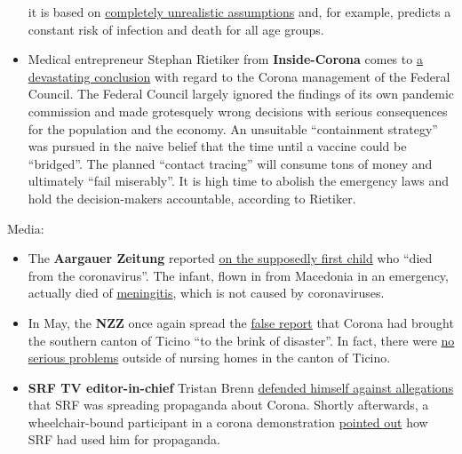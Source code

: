 \begin{itemize}
  it is based on
  \href{https://www.heise.de/tp/features/Fellay-Studie-Zweite-Corona-Welle-4726303.html}{completely
  unrealistic assumptions} and, for example, predicts a constant risk of
  infection and death for all age groups.
\item
  Medical entrepreneur Stephan Rietiker from \textbf{Inside-Corona}
  comes to
  \href{https://www.insidecorona.ch/2020/05/21/coronakrise-professionelles-krisenmanagement-sieht-anders-aus/}{a
  devastating conclusion} with regard to the Corona management of the
  Federal Council. The Federal Council largely ignored the findings of
  its own pandemic commission and made grotesquely wrong decisions with
  serious consequences for the population and the economy. An unsuitable
  ``containment strategy'' was pursued in the naive belief that the time
  until a vaccine could be ``bridged''. The planned ``contact tracing''
  will consume tons of money and ultimately ``fail miserably''. It is
  high time to abolish the emergency laws and hold the decision-makers
  accountable, according to Rietiker.
\end{itemize}

Media:

\begin{itemize}
\tightlist
\item
  The \textbf{Aargauer Zeitung} reported
  \href{https://www.aargauerzeitung.ch/aargau/kanton-aargau/erstes-kind-am-coronavirus-gestorben-aargauer-saeugling-zur-behandlung-heimgeflogen-137988950}{on
  the supposedly first child} who ``died from the coronavirus''. The
  infant, flown in from Macedonia in an emergency, actually died of
  \href{https://www.srf.ch/news/regional/aargau-solothurn/verwirrung-um-todesursache-trauriges-ereignis-aargauer-baby-stirbt-nach-corona-infektion}{meningitis},
  which is not caused by coronaviruses.
\item
  In May, the \textbf{NZZ} once again spread the
  \href{https://www.nzz.ch/gesellschaft/wie-corona-das-tessin-an-den-rand-einer-katastrophe-brachte-und-die-willensnation-auf-die-probe-stellte-ld.1556749}{false
  report} that Corona had brought the southern canton of Ticino ``to the
  brink of disaster''. In fact, there were
  \href{https://www.blick.ch/news/schweiz/tessin/tessiner-spitaldirektor-widerspricht-dem-bundesamt-fuer-gesundheit-wir-haben-genuegend-intensivbetten-id15808076.html}{no
  serious problems} outside of nursing homes in the canton of Ticino.
\item
  \textbf{SRF TV editor-in-chief} Tristan Brenn
  \href{https://www.srf.ch/news/schweiz/berichterstattung-zu-corona-srf-chefredaktor-nimmt-stellung-zu-fakenews-vorwuerfen}{defended
  himself against allegations} that SRF was spreading propaganda about
  Corona. Shortly afterwards, a wheelchair-bound participant in a corona
  demonstration
  \href{https://www.youtube.com/watch?v=9BA83YQT7AE}{pointed out} how
  SRF had used him for propaganda.
\end{itemize}

